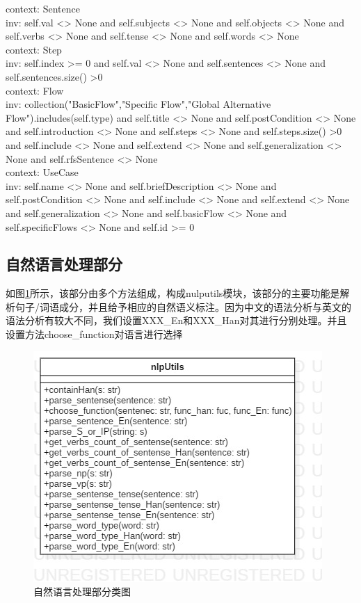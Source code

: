    	context: Sentence\\
   	inv: self.val <> None and self.subjects <> None and self.objects <> None and self.verbs <> None and self.tense <> None and self.words <> None\\
   	context: Step\\
   	inv: self.index >= 0 and self.val <> None and self.sentences <> None and self.sentences.size() >0\\
   	context: Flow\\
   	inv: collection("BasicFlow","Specific Flow","Global Alternative Flow").includes(self.type) and self.title <> None and self.postCondition <> None and self.introduction <> None 	and self.steps <> None and self.steps.size() >0 and self.include <> None and self.extend <> None and self.generalization <> None and self.rfsSentence <> None\\
   	context: UseCase\\
   	inv: self.name <> None and self.briefDescription <> None and self.postCondition <> None and self.include <> None and self.extend <> None and self.generalization <> None	and self.basicFlow <> None and self.specificFlows <> None and self.id >= 0
   	
   
    \subsection{自然语言处理部分}
	如图\ref{classDiagram_nlputils}所示，该部分由多个方法组成，构成nulputils模块，该部分的主要功能是解析句子/词语成分，并且给予相应的自然语义标注。因为中文的语法分析与英文的语法分析有较大不同，我们设置XXX\_En和XXX\_Han对其进行分别处理。并且设置方法choose\_function对语言进行选择
    	\begin{figure}
	\centering
	\includegraphics[width=.5\textwidth]{src/classDiagram_nlputils.jpg} 
	\caption{自然语言处理部分类图} 
	\label{classDiagram_nlputils}
	\end{figure}

